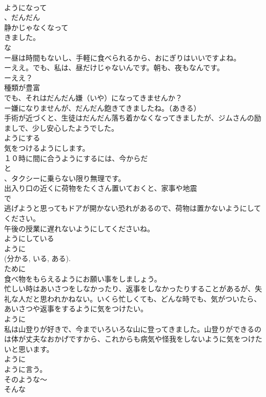 \documentclass[8pt]{extreport}
\begin{document}
\begin{CJK}{UTF8}{min}
\\	ようになって
\\	、だんだん
\\	静かじゃなくなって
\\	きました。
\\	な
\\	ー昼は時間もないし、手軽に食べられるから、おにぎりはいいですよね。
\\	ーええ。でも、私は、昼だけじゃないんです。朝も、夜もなんです。
\\	ーええ？
\\	種類が豊富
\\	でも、それはだんだん嫌（いや）になってきませんか？
\\	ー嫌になりませんが、だんだん飽きてきましたね。（あきる）
\\	手術が近づくと、生徒はだんだん落ち着かなくなってきましたが、ジムさんの励ましで、少し安心したようでした。
\\	ようにする
\\	気をつけるようにします。
\\	１０時に間に合うようにするには、今からだ
\\	と
\\	、タクシーに乗らない限り無理です。
\\	出入り口の近くに荷物をたくさん置いておくと、家事や地震
\\	で
\\	逃げようと思ってもドアが開かない恐れがあるので、荷物は置かないようにしてください。
\\	午後の授業に遅れないようにしてくださいね。
\\	ようにしている
\\	ように
\\	(分かる, いる, ある). 
\\	ために 
\\	食べ物をもらえるようにお願い事をしましょう。
\\	忙しい時はあいさつをしなかったり、返事をしなかったりすることがあるが、失礼な人だと思われかねない。いくら忙しくても、どんな時でも、気がついたら、あいさつや返事をするように気をつけたい。
\\	ように
\\	私は山登りが好きで、今までいろいろな山に登ってきました。山登りができるのは体が丈夫なおかげですから、これからも病気や怪我をしないように気をつけたいと思います。
\\	ように
\\	ように言う。
\\	そのような～
\\	そんな

\end{CJK}
\end{document}
